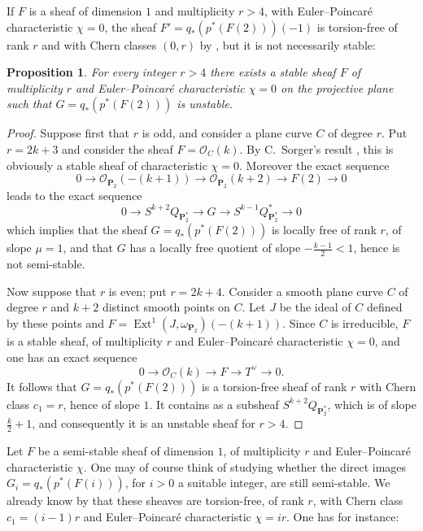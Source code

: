 \documentclass[12pt,english]{smfart}%
\theoremstyle{plain}
\newtheorem{proposition}[theorem]{Proposition}
\theoremstyle{definition}
\theoremstyle{remark}
\newcommand{\PP}{\mathbf{P}}
\newcommand{\Pd}{\PP_{2}^{*}}          %
\newcommand{\Oo}{\mathcal{O}}
\DeclareMathOperator{\Ext}{Ext}
\begin{document}
If $F$ is a sheaf of dimension $1$ and multiplicity $r>4$, with Euler--Poincar\'e characteristic $\chi=0$, the sheaf $F' = q_*(p^*(F(2)))(-1)$ is torsion-free of rank $r$ and with Chern classes $(0,r)$ by , but it is not necessarily stable:

\begin{proposition}\label{prop:unstable}
For every integer $r>4$ there exists a stable sheaf $F$ of multiplicity $r$ and Euler--Poincar\'e characteristic $\chi=0$ on the projective plane such that $G=q_*(p^*(F(2)))$ is unstable.
\end{proposition}

\begin{proof}
Suppose first that $r$ is odd, and consider a plane curve $C$ of degree $r$. Put $r=2k+3$ and consider the sheaf $F=\Oo_C(k)$. By C.\ Sorger's result \cite{Sor}, this is obviously a stable sheaf of characteristic $\chi=0$. Moreover the exact sequence
\[
0\longrightarrow \Oo_{\PP_2}(-(k+1))\longrightarrow \Oo_{\PP_2}(k+2)
\longrightarrow F(2)\longrightarrow 0
\]
leads to the exact sequence
\[
0\longrightarrow S^{k+2}Q_{\Pd}\longrightarrow G\longrightarrow
S^{k-1}Q^{*}_{\Pd}\longrightarrow 0
\]
which implies that the sheaf $G=q_*(p^*(F(2)))$ is locally free of rank $r$, of slope $\mu=1$, and that $G$ has a locally free quotient of slope $-\frac{k-1}{2}<1$, hence is not semi-stable.

Now suppose that $r$ is even; put $r=2k+4$. Consider a smooth plane curve $C$ of degree $r$ and $k+2$ distinct smooth points on $C$. Let $J$ be the ideal of $C$ defined by these points and $F = \Ext^1(J,\omega_{\PP_2})(-(k+1))$. Since $C$ is irreducible, $F$ is a stable sheaf, of multiplicity $r$ and Euler--Poincar\'e characteristic $\chi=0$, and one has an exact sequence
\[
0\longrightarrow \Oo_C(k)\longrightarrow F\longrightarrow T^{\vee}
\longrightarrow 0 .
\]
It follows that $G=q_*(p^*(F(2)))$ is a torsion-free sheaf of rank $r$ with Chern class $c_1=r$, hence of slope $1$. It contains as a subsheaf $S^{k+2}Q_{\Pd}$, which is of slope $\frac k2+1$, and consequently it is an unstable sheaf for $r>4$.
\end{proof}

Let $F$ be a semi-stable sheaf of dimension $1$, of multiplicity $r$ and Euler--Poincar\'e characteristic $\chi$. One may of course think of studying whether the direct images $G_i = q_*(p^*(F(i)))$, for $i>0$ a suitable integer, are still semi-stable. We already know by  that these sheaves are torsion-free, of rank $r$, with Chern class $c_1=(i-1)r$ and Euler--Poincar\'e characteristic $\chi=ir$. One has for instance:
\end{document}
